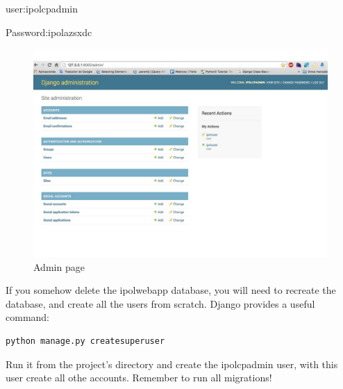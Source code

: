 user:ipolcpadmin

Password:ipolazsxdc

\begin{figure}[!ht]
\centering
\includegraphics[width=0.5\columnwidth]{images/admin.pdf}
\caption{Admin page} 
\label{fi:admin_page}
\end{figure}


If you somehow delete the ipolwebapp database, you will need to recreate the database, and create all the users from scratch. Django provides a useful command: 

\begin{lstlisting}[language=Python,firstnumber=1]
python manage.py createsuperuser
\end{lstlisting}

Run it from the project's directory and create the ipolcpadmin user, 
with this user create all othe accounts.
Remember to run all migrations!




